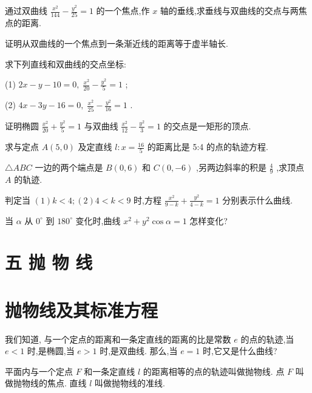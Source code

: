 \documentclass[lang=cn,newtx,10pt,scheme=chinese]{elegantbook}
\begin{document}
\begin{problemset}[习 题 七]
\item 通过双曲线 \(\frac{{x}^{2}}{144} - \frac{{y}^{2}}{25} = 1\) 的一个焦点,作 \(x\) 轴的垂线,求垂线与双曲线的交点与两焦点的距离.

\item 证明从双曲线的一个焦点到一条渐近线的距离等于虚半轴长.

\item 求下列直线和双曲线的交点坐标:

(1) \({2x} - y - {10} = 0,\;\frac{{x}^{2}}{20} - \frac{{y}^{2}}{5} = 1\) ;

(2) \({4x} - {3y} - {16} = 0,\;\frac{{x}^{2}}{25} - \frac{{y}^{2}}{16} = 1\) .

\item 证明椭圆 \(\frac{{x}^{2}}{20} + \frac{{y}^{2}}{5} = 1\) 与双曲线 \(\frac{{x}^{2}}{12} - \frac{{y}^{2}}{3} = 1\) 的交点是一矩形的顶点.

\item 求与定点 \(A\left( {5,0}\right)\) 及定直线 \(l : x = \frac{16}{5}\) 的距离比是 5:4 的点的轨迹方程.

\item \(\bigtriangleup {ABC}\) 一边的两个端点是 \(B\left( {0,6}\right)\) 和 \(C\left( {0, - 6}\right)\) ,另两边斜率的积是 \(\frac{4}{9}\) ,求顶点 \(A\) 的轨迹.

\item 判定当 \(\left( 1\right) k < 4;\left( 2\right) 4 < k < 9\) 时,方程 \(\frac{{x}^{2}}{9 - k} + \frac{{y}^{2}}{4 - k} = 1\) 分别表示什么曲线.

\item 当 \(\alpha\) 从 \({0}^{ \circ }\) 到 \({180}^{ \circ }\) 变化时,曲线 \({x}^{2} + {y}^{2}\cos \alpha = 1\) 怎样变化?

\end{problemset}

\section*{五 抛 物 线}

\section{抛物线及其标准方程}

我们知道, 与一个定点的距离和一条定直线的距离的比是常数 \(e\) 的点的轨迹,当 \(e < 1\) 时,是椭圆,当 \(e > 1\) 时,是双曲线. 那么,当 \(e = 1\) 时,它又是什么曲线?

平面内与一个定点 \(F\) 和一条定直线 \(l\) 的距离相等的点的轨迹叫做抛物线. 点 \(F\) 叫做抛物线的焦点. 直线 \(l\) 叫做抛物线的准线.
\end{document}
